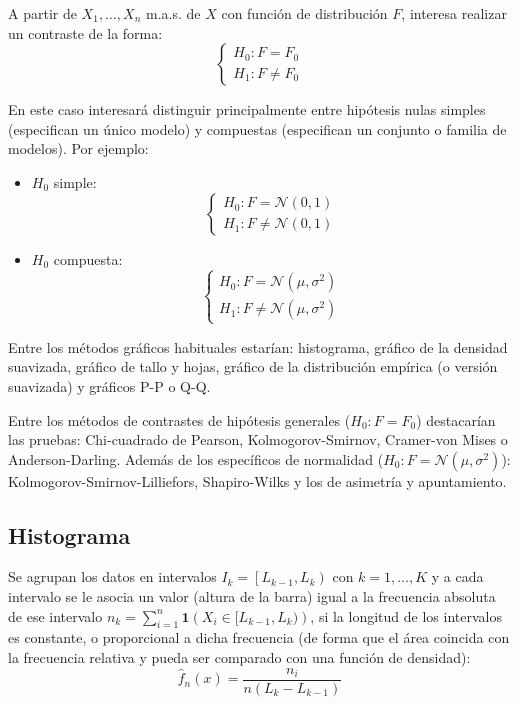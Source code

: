 \documentclass[
]{book}
\theoremstyle{break}
\theoremstyle{nonumberplain}
\begin{document}
A partir de \(X_1,\ldots,X_n\) m.a.s. de \(X\) con función de
distribución \(F\), interesa realizar un contraste de la forma:
\[\left \{
\begin{array}{l}
H_0:F=F_0\\
H_1:F\neq F_0
\end{array}
\right.\]

En este caso interesará distinguir principalmente entre hipótesis nulas simples (especifican un único modelo) y compuestas (especifican un conjunto o familia de modelos).
Por ejemplo:

\begin{itemize}
\item
  \(H_0\) simple:
  \[\left \{
  \begin{array}{l}  
  H_0:F= \mathcal{N}(0,1)\\
  H_1:F\neq \mathcal{N}(0,1)
  \end{array}
  \right.\]
\item
  \(H_0\) compuesta:
  \[\left \{
  \begin{array}{l}  
  H_0:F= \mathcal{N}(\mu,\sigma^2)\\
  H_1:F\neq \mathcal{N}(\mu,\sigma^2)
  \end{array}
  \right.\]
\end{itemize}

Entre los métodos gráficos habituales estarían: histograma, gráfico de la densidad suavizada, gráfico de tallo y hojas, gráfico de la distribución empírica (o versión suavizada) y gráficos P-P o Q-Q.

Entre los métodos de contrastes de hipótesis generales (\(H_0:F=F_0\)) destacarían las pruebas: Chi-cuadrado de Pearson, Kolmogorov-Smirnov, Cramer-von Mises o Anderson-Darling.
Además de los específicos de normalidad (\(H_0:F= \mathcal{N}(\mu,\sigma^2)\)): Kolmogorov-Smirnov-Lilliefors, Shapiro-Wilks y los de asimetría y apuntamiento.

\hypertarget{histograma}{%
\subsection{Histograma}\label{histograma}}

Se agrupan los datos en intervalos \(I_{k}=\left[ L_{k-1},L_{k}\right)\) con \(k=1, \ldots, K\) y a cada intervalo se le asocia un valor (altura de la barra) igual a la frecuencia absoluta de ese intervalo \(n_k = \sum_{i=1}^{n}\mathbf{1}\left( X_i \in [L_{k-1},L_{k}) \right)\), si la longitud de los intervalos es constante, o proporcional a dicha frecuencia (de forma que el área coincida con la frecuencia relativa y pueda ser comparado con una función de densidad):
\[\hat{f}_n(x)=\frac{n_{i}}{n\left(  L_{k}-L_{k-1}\right)}\]
\end{document}
